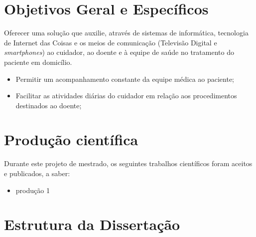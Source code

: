\section{Objetivos Geral e Específicos}\label{sec:objetivos}

Oferecer uma solução que auxilie, através de sistemas de informática, tecnologia
de Internet das Coisas e os meios de comunicação (Televisão Digital e 
\textit{smartphones}) ao cuidador, ao doente e à equipe de saúde no tratamento 
do paciente em domicílio.

\begin{itemize}
  \item Permitir um acompanhamento constante da equipe médica ao paciente;
  \item Facilitar as atividades diárias do cuidador em relação aos procedimentos
  destinados ao doente;
\end{itemize}

\section{Produção científica}\label{sec:producao}  

Durante este projeto de mestrado, os seguintes trabalhos científicos foram
aceitos e publicados, a saber:

\begin{itemize}
  \item produção 1
\end{itemize}

\section{Estrutura da Dissertação}\label{sec:estrutura}
